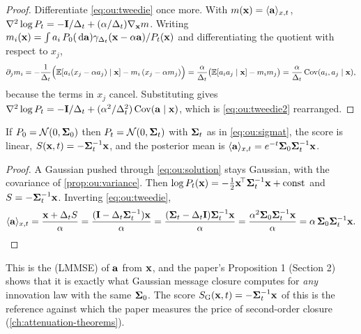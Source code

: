 \begin{proof}
Differentiate \cref{eq:ou:tweedie} once more. With $m(\mathbf{x})=\langle \mathbf{a} \rangle_{x,t}$,
$\nabla^2\log P_t=-\mathbf{I}/\Delta_t+(\alpha/\Delta_t)\nabla_{\mathbf{x}}m$. Writing
$m_i(\mathbf{x})=\int a_i\,P_0(\,\mathrm{d}\mathbf{a})\gamma_{\Delta_t}(\mathbf{x}-\alpha\mathbf{a})/P_t(\mathbf{x})$ and differentiating
the quotient with respect to $x_j$,
\[
  \partial_j m_i=-\frac1{\Delta_t}\Bigl(\mathbb{E}[a_i(x_j-\alpha a_j)\mid\mathbf{x}]-m_i\,(x_j-\alpha m_j)\Bigr)
               =\frac{\alpha}{\Delta_t}\bigl(\mathbb{E}[a_ia_j\mid\mathbf{x}]-m_im_j\bigr)
               =\frac{\alpha}{\Delta_t}\operatorname{Cov}(a_i,a_j\mid\mathbf{x}),
\]
because the terms in $x_j$ cancel. Substituting gives
$\nabla^2\log P_t=-\mathbf{I}/\Delta_t+(\alpha^2/\Delta_t^2)\operatorname{Cov}(\mathbf{a}\mid\mathbf{x})$, which is
\cref{eq:ou:tweedie2} rearranged.
\end{proof}


\begin{corollary}
\label{cor:ou:gaussian}
If $P_0=\mathcal{N}\!\left(0,\mathbf{\Sigma}_0\right)$ then $P_t=\mathcal{N}\!\left(0,\mathbf{\Sigma}_t\right)$ with $\mathbf{\Sigma}_t$ as in
\cref{eq:ou:sigmat}, the score is linear, $S(\mathbf{x},t)=-\mathbf{\Sigma}_t^{-1}\mathbf{x}$, and the
posterior mean is $\langle \mathbf{a} \rangle_{x,t}=e^{-t}\mathbf{\Sigma}_0\mathbf{\Sigma}_t^{-1}\mathbf{x}$.
\end{corollary}

\begin{proof}
A Gaussian pushed through \cref{eq:ou:solution} stays Gaussian, with the covariance of
\cref{prop:ou:variance}. Then $\log P_t(\mathbf{x})=-\tfrac12\mathbf{x}^{\!\top}\mathbf{\Sigma}_t^{-1}\mathbf{x}+\text{const}$
and $S=-\mathbf{\Sigma}_t^{-1}\mathbf{x}$. Inverting \cref{eq:ou:tweedie},
\[
  \langle \mathbf{a} \rangle_{x,t}=\frac{\mathbf{x}+\Delta_tS}{\alpha}
             =\frac{(\mathbf{I}-\Delta_t\mathbf{\Sigma}_t^{-1})\mathbf{x}}{\alpha}
             =\frac{(\mathbf{\Sigma}_t-\Delta_t\mathbf{I})\mathbf{\Sigma}_t^{-1}\mathbf{x}}{\alpha}
             =\frac{\alpha^2\mathbf{\Sigma}_0\mathbf{\Sigma}_t^{-1}\mathbf{x}}{\alpha}
             =\alpha\,\mathbf{\Sigma}_0\mathbf{\Sigma}_t^{-1}\mathbf{x} .\qedhere
\]
\end{proof}

This is the  (LMMSE) of $\mathbf{a}$ from $\mathbf{x}$,
and the paper's Proposition 1 (Section 2) shows that it is exactly what Gaussian
message closure computes for \emph{any} innovation law with the same $\mathbf{\Sigma}_0$. The
score $S_{\mathrm{G}}(\mathbf{x},t)=-\mathbf{\Sigma}_t^{-1}\mathbf{x}$ of this  is the reference
against which the paper measures the price of second-order closure
(\cref{ch:attenuation-theorems}).

